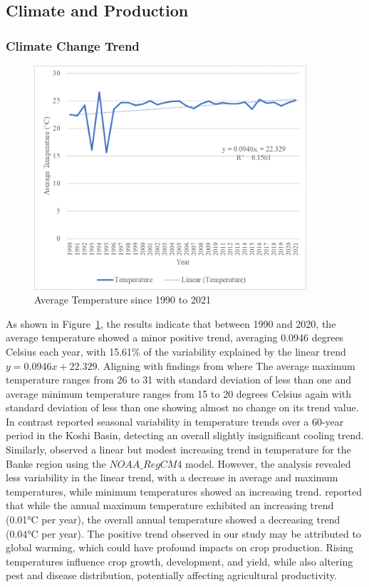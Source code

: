 \subsection{Climate and Production}

\subsubsection{Climate Change Trend}
\begin{figure}[H]
    \centering
    \caption{Average Temperature since 1990 to 2021} 
    \label{fig:trend_avg_temp}
    \includegraphics[width=0.9\textwidth]{images/trend_avg_temp.png}
\end{figure}

As shown in Figure~\ref{fig:trend_avg_temp}, the results indicate that between 1990 and 2020, the average temperature showed a minor positive trend, averaging 0.0946 degrees Celsius each year, with 15.61\% of the variability explained by the linear trend \( y = 0.0946x + 22.329 \). Aligning with findings from \parencite{regmiCROPYIELDRESPONSE2019} where  The average maximum temperature ranges from 26 to 31 with standard deviation of less than one and average minimum temperature ranges from 15 to 20 degrees Celsius again with standard deviation of less than one showing almost no change on its trend value. In contrast  \parencite{puriSpatialTemporalVariations2024} reported seasonal variability in temperature trends over a 60-year period in the Koshi Basin, detecting an overall slightly insignificant cooling trend. Similarly, \parencite{risalImpactClimateChange2022} observed a linear but modest increasing trend in temperature for the Banke region using the $NOAA\_RegCM4$ model. However, the analysis revealed less variability in the linear trend, with a decrease in average and maximum temperatures, while minimum temperatures showed an increasing trend. \parencite{dawadiImpactClimateChange2022} reported that while the annual maximum temperature exhibited an increasing trend (0.01°C per year), the overall annual temperature showed a decreasing trend (0.04°C per year).
The positive trend observed in our study may be attributed to global warming, which could have profound impacts on crop production. Rising temperatures influence crop growth, development, and yield, while also altering pest and disease distribution, potentially affecting agricultural productivity.

